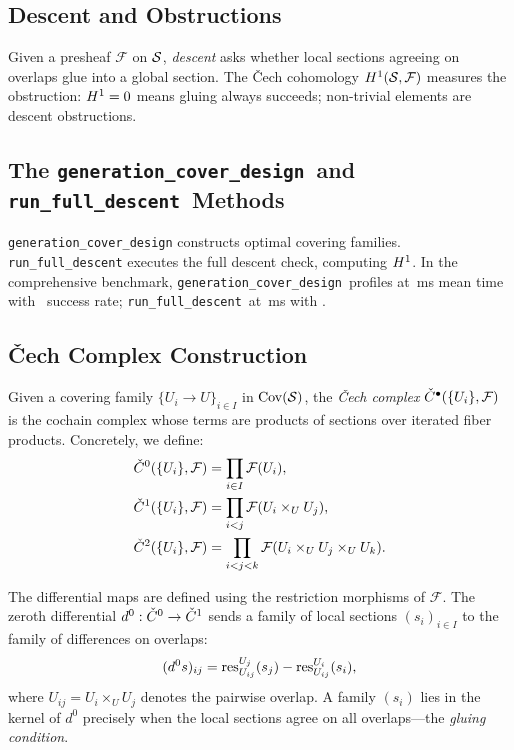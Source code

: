 \documentclass[11pt]{article}
\newcommand{\GenCoverDesign}{\texttt{generation\_cover\_design}}
\newcommand{\RunDescent}{\texttt{run\_full\_descent}}
\begin{document}
\subsection{Descent and Obstructions}
Given a presheaf $\mathcal{F}$ on $\mathcal{S}$, \emph{descent} asks whether
local sections agreeing on overlaps glue into a global section.  The
\v{C}ech cohomology $H^{1}(\mathcal{S}, \mathcal{F})$ measures the
obstruction: $H^{1} = 0$ means gluing always succeeds; non-trivial
elements are descent obstructions.

\subsection{The \GenCoverDesign\ and \RunDescent\ Methods}
\texttt{generation\_cover\_design} constructs optimal covering families.
\texttt{run\_full\_descent} executes the full descent check, computing
$H^{1}$.  In the comprehensive benchmark, \GenCoverDesign\ profiles at
\compProfGenerationCoverDesignMeanMs\,ms mean time with
\compProfGenerationCoverDesignRate\ success rate; \RunDescent\ at
\compProfRunFullDescentMeanMs\,ms with \compProfRunFullDescentRate.

\subsection{\v{C}ech Complex Construction}\label{sec:cech-construction}

Given a covering family $\{U_i \to U\}_{i \in I}$ in $\mathrm{Cov}(\mathcal{S})$, the
\emph{\v{C}ech complex} $\check{C}^\bullet(\{U_i\}, \mathcal{F})$ is the
cochain complex whose terms are products of sections over iterated fiber
products.  Concretely, we define:
\begin{align}
  \check{C}^0(\{U_i\}, \mathcal{F})
    &= \prod_{i \in I} \mathcal{F}(U_i), \label{eq:cech0}\\
  \check{C}^1(\{U_i\}, \mathcal{F})
    &= \prod_{i < j} \mathcal{F}(U_i \times_U U_j), \label{eq:cech1}\\
  \check{C}^2(\{U_i\}, \mathcal{F})
    &= \prod_{i < j < k} \mathcal{F}(U_i \times_U U_j \times_U U_k).
      \label{eq:cech2}
\end{align}

The differential maps are defined using the restriction morphisms of
$\mathcal{F}$.  The zeroth differential $d^0 : \check{C}^0 \to \check{C}^1$ sends
a family of local sections $(s_i)_{i \in I}$ to the family of differences
on overlaps:
\begin{equation}\label{eq:d0}
  (d^0 s)_{ij} = \mathrm{res}_{U_{ij}}^{U_j}(s_j) - \mathrm{res}_{U_{ij}}^{U_i}(s_i),
\end{equation}
where $U_{ij} = U_i \times_U U_j$ denotes the pairwise overlap.  A family
$(s_i)$ lies in the kernel of $d^0$ precisely when the local sections agree
on all overlaps---the \emph{gluing condition}.
\end{document}
